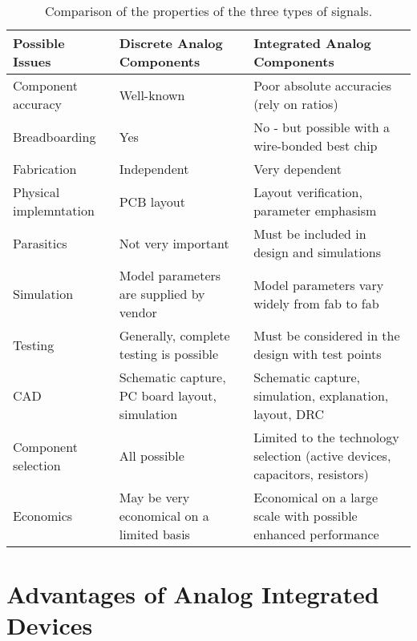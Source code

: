 \documentclass[11pt,fleqn]{book} %
\begin{document}
\begin{table}[h]
  \centering
  \begin{tabulary}{1\textwidth}{|l|L|L|}
    \hline
    \textbf{Possible Issues} & \textbf{Discrete Analog Components} & \textbf{Integrated Analog Components}\\
    \hline
    Component accuracy & Well-known & Poor absolute accuracies (rely on ratios) \\
    \hline
    Breadboarding & Yes & No - but possible with a wire-bonded best chip \\
    \hline
    Fabrication & Independent & Very dependent \\
    \hline
    Physical implemntation & PCB layout & Layout verification, parameter emphasism \\
    \hline
    Parasitics & Not very important & Must be included in design and simulations \\
    \hline
    Simulation & Model parameters are supplied by vendor & Model parameters vary widely from fab to fab \\
    \hline
    Testing & Generally, complete testing is possible & Must be considered in the design with test points \\
    \hline
    CAD & Schematic capture, PC board layout, simulation & Schematic capture, simulation, explanation, layout, DRC \\
    \hline
    Component selection & All possible & Limited to the technology selection (active devices, capacitors, resistors) \\
    \hline
    Economics & May be very economical on a limited basis & Economical on a large scale with possible enhanced performance \\
    \hline
  \end{tabulary}
  \caption{Comparison of the properties of the three types of signals.}
\end{table}


\section{Advantages of Analog Integrated Devices}
\end{document}
